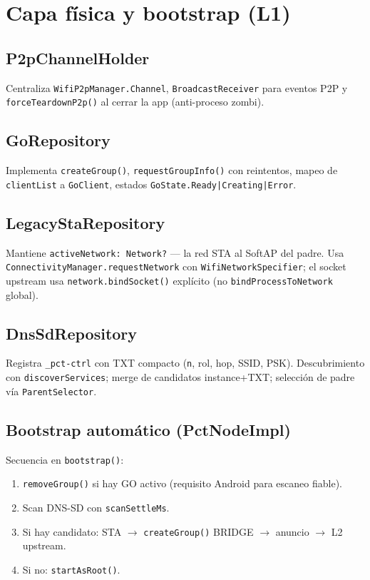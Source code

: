 \section{Capa física y bootstrap (L1)}
\label{sec:impl-l1}

\subsection{P2pChannelHolder}

Centraliza \texttt{WifiP2pManager.Channel}, \texttt{BroadcastReceiver} para eventos P2P y \texttt{forceTeardownP2p()} al cerrar la app (anti-proceso zombi).

\subsection{GoRepository}

Implementa \texttt{createGroup()}, \texttt{requestGroupInfo()} con reintentos, mapeo de \texttt{clientList} a \texttt{GoClient}, estados \texttt{GoState.Ready|Creating|Error}.

\subsection{LegacyStaRepository}

Mantiene \texttt{activeNetwork: Network?} --- la red STA al SoftAP del padre. Usa \texttt{ConnectivityManager.requestNetwork} con \texttt{WifiNetworkSpecifier}; el socket upstream usa \texttt{network.bindSocket()} explícito (no \texttt{bindProcessToNetwork} global).

\subsection{DnsSdRepository}

Registra \texttt{\_pct-ctrl} con TXT compacto (\texttt{n}, rol, hop, SSID, PSK). Descubrimiento con \texttt{discoverServices}; merge de candidatos instance+TXT; selección de padre vía \texttt{ParentSelector}.

\subsection{Bootstrap automático (PctNodeImpl)}

Secuencia en \texttt{bootstrap()}:
\begin{enumerate}
  \item \texttt{removeGroup()} si hay GO activo (requisito Android para escaneo fiable).
  \item Scan DNS-SD con \texttt{scanSettleMs}.
  \item Si hay candidato: STA $\rightarrow$ \texttt{createGroup()} BRIDGE $\rightarrow$ anuncio $\rightarrow$ L2 upstream.
  \item Si no: \texttt{startAsRoot()}.
\end{enumerate}

